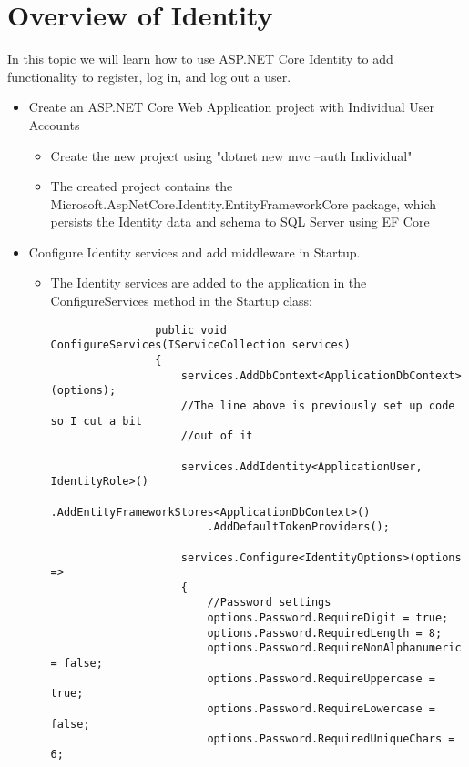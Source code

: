 \documentclass{report}
\begin{document}
    \section{Overview of Identity}
    In this topic we will learn how to use ASP.NET Core Identity to add functionality to
    register, log in, and log out a user.
    \begin{itemize}
        \item Create an ASP.NET Core Web Application project with Individual User Accounts
        \begin{itemize}
            \item Create the new project using "dotnet new mvc --auth Individual"
            \item The created project contains the Microsoft.AspNetCore.Identity.EntityFrameworkCore
            package, which persists the Identity data and schema to SQL Server using EF Core
        \end{itemize}
        \item Configure Identity services and add middleware in Startup.
        \begin{itemize}
            \item The Identity services are added to the application in the ConfigureServices method
            in the Startup class:
            \lstset{style=sharpc}
            \begin{lstlisting}
                public void ConfigureServices(IServiceCollection services)
                {
                    services.AddDbContext<ApplicationDbContext>(options);
                    //The line above is previously set up code so I cut a bit
                    //out of it

                    services.AddIdentity<ApplicationUser, IdentityRole>()
                        .AddEntityFrameworkStores<ApplicationDbContext>()
                        .AddDefaultTokenProviders();
                    
                    services.Configure<IdentityOptions>(options =>
                    {
                        //Password settings
                        options.Password.RequireDigit = true;
                        options.Password.RequiredLength = 8;
                        options.Password.RequireNonAlphanumeric = false;
                        options.Password.RequireUppercase = true;
                        options.Password.RequireLowercase = false;
                        options.Password.RequiredUniqueChars = 6;


\end{lstlisting}
\end{itemize}
\end{itemize}
\end{document}
